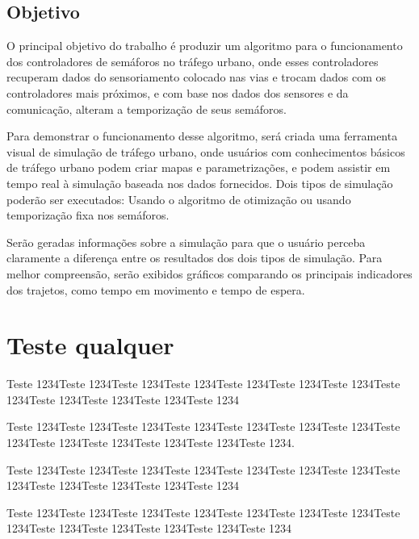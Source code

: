 \documentclass[
	12pt,					%
	openright,		%
	oneside,			%
	a4paper,			%
	english,			%
	french,				%
	spanish,			%
	brazil,				%
	]{abntex2}
\begin{document}
\section{Objetivo}

O principal objetivo do trabalho é produzir um algoritmo para o funcionamento dos controladores de semáforos no tráfego urbano, onde esses controladores recuperam dados do sensoriamento colocado nas vias e trocam dados com os controladores mais próximos, e com base nos dados dos sensores e da comunicação, alteram a temporização de seus semáforos.

Para demonstrar o funcionamento desse algoritmo, será criada uma ferramenta visual de simulação de tráfego urbano, onde usuários com conhecimentos básicos de tráfego urbano podem criar mapas e parametrizações, e podem assistir em tempo real à simulação baseada nos dados fornecidos. Dois tipos de simulação poderão ser executados: Usando o algoritmo de otimização ou usando temporização fixa nos semáforos.

Serão geradas informações sobre a simulação para que o usuário perceba claramente a diferença entre os resultados dos dois tipos de simulação. Para melhor compreensão, serão exibidos gráficos comparando os principais indicadores dos trajetos, como tempo em movimento e tempo de espera.

\chapter{Teste qualquer}

Teste 1234Teste  1234Teste 1234Teste 1234Teste 1234Teste 1234Teste 1234Teste 1234Teste 1234Teste 1234Teste 1234Teste 1234 \nocite{schmidt2011arduino}

Teste 1234Teste 1234Teste 1234Teste 1234Teste 1234Teste 1234Teste 1234Teste 1234Teste 1234Teste 1234Teste 1234Teste 1234Teste 1234.

Teste 1234Teste 1234Teste 1234Teste 1234Teste 1234Teste 1234Teste 1234Teste 1234Teste 1234Teste 1234Teste 1234Teste 1234

Teste 1234Teste 1234Teste 1234Teste 1234Teste 1234Teste 1234Teste 1234Teste 1234Teste 1234Teste 1234Teste 1234Teste 1234Teste 1234


\end{document}
